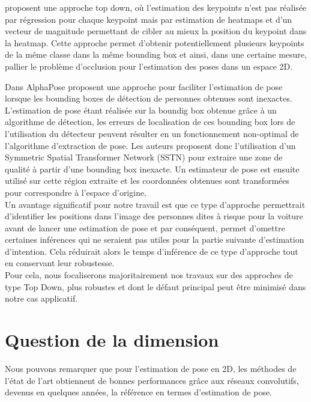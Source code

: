 \cite{2017arXiv170101779P} proposent une approche top down, où l'estimation des keypoints n'est pas réalisée par régression pour chaque keypoint mais par estimation de heatmaps et d'un vecteur de magnitude permettant de cibler au mieux la position du keypoint dans la heatmap. Cette approche permet d'obtenir potentiellement plusieurs keypoints de la même classe dans la même bounding box et ainsi, dans une certaine mesure, pallier le problème d'occlusion pour l'estimation des poses dans un espace 2D. 

Dans AlphaPose \cite{fang2017rmpe} proposent une approche pour faciliter l'estimation de pose lorsque les bounding boxes de détection de personnes obtenues sont inexactes. L'estimation de pose étant réalisée sur la boundig box obtenue grâce à un algorithme de détection, les erreurs de localisation de ces bounding box lors de l'utilisation du détecteur peuvent résulter en un fonctionnement non-optimal de l'algorithme d'extraction de pose. Les auteurs proposent donc l'utilisation d'un Symmetric Spatial Transformer Network (SSTN) pour extraire une zone de qualité à partir d'une bounding box inexacte. Un estimateur de pose est ensuite utilisé sur cette région extraite et les coordonnées obtenues sont transformées pour correspondre à l'espace d'origine.\\

Un avantage significatif pour notre travail est que ce type d'approche permettrait d'identifier les positions dans l'image des personnes dites à risque pour la voiture avant de lancer une estimation de pose et par conséquent, permet d'omettre certaines inférences qui ne seraient pas utiles pour la partie suivante d'estimation d'intention. Cela réduirait alors le temps d'inférence de ce type d'approche tout en conservant leur robustesse.\\

Pour cela, nous focaliserons majoritairement nos travaux sur des approches de type Top Down, plus robustes et dont le défaut principal peut être minimisé dans notre cas applicatif.




\section{Question de la dimension}
Nous pouvons remarquer que pour l'estimation de pose en 2D, les méthodes de l'état de l'art obtiennent de bonnes performances grâce aux réseaux convolutifs, devenus en quelques années, la référence en termes d'estimation de pose.

